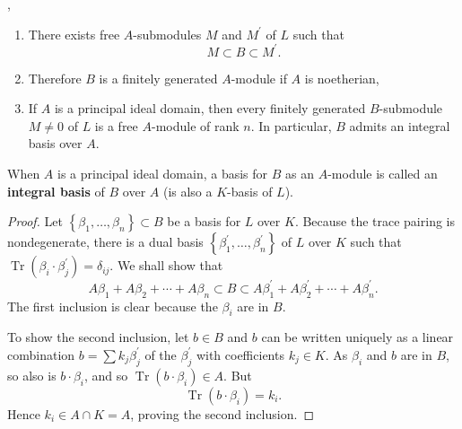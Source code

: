 \documentclass[12pt, oneside]{book}
\begin{document}
\begin{proposition}
    ,\label{pro:Rings of integers are finitely generated}
    \begin{enumerate}
        \item
              There exists free $A$-submodules $M$ and $M^{\prime}$ of $L$ such that
              \begin{equation*}
                  M \subset B \subset M^{\prime} .
              \end{equation*}
        \item
              Therefore $B$ is a finitely generated $A$-module if $A$ is noetherian,
        \item
              If $A$ is a principal ideal domain, then every finitely generated $B$-submodule $M \neq 0$ of $L$ is a free $A$-module of rank $n$.
              In particular, $B$ admits an integral basis over $A$.
    \end{enumerate}
    \begin{remark}
        When $A$ is a principal ideal domain, a basis for $B$ as an $A$-module is called an \textbf{integral basis} of $B$ over $A$ (is also a $K$-basis of $L$).
    \end{remark}
    \begin{proof}
        Let $\left\{\beta_1, \ldots, \beta_n\right\}\subset B$ be a basis for $L$ over $K$.
        Because the trace pairing is nondegenerate, there is a dual basis $\left\{\beta_1^{\prime}, \ldots, \beta_n^{\prime}\right\}$ of $L$ over $K$ such that $\operatorname{Tr}\left(\beta_i \cdot \beta_j^{\prime}\right)=\delta_{i j}$.
        We shall show that
        \begin{equation*}
            A \beta_1+A \beta_2+\cdots+A \beta_n \subset B \subset A \beta_1^{\prime}+A \beta_2^{\prime}+\cdots+A \beta_n^{\prime} .
        \end{equation*}
        The first inclusion is clear because the $\beta_i$ are in $B$.

        To show the second inclusion, let $b \in B$ and $b$ can be written uniquely as a linear combination $b=\sum k_j \beta_j^{\prime}$ of the $\beta_j^{\prime}$ with coefficients $k_j \in K$.
        As $\beta_i$ and $b$ are in $B$, so also is $b \cdot \beta_i$, and so $\operatorname{Tr}\left(b \cdot \beta_i\right) \in A$.
        But
        \begin{equation*}
            \operatorname{Tr}\left(b \cdot \beta_i\right)=k_i .
        \end{equation*}
        Hence $k_i \in A\cap K= A$, proving the second inclusion.
    \end{proof}
\end{proposition}
\end{document}
